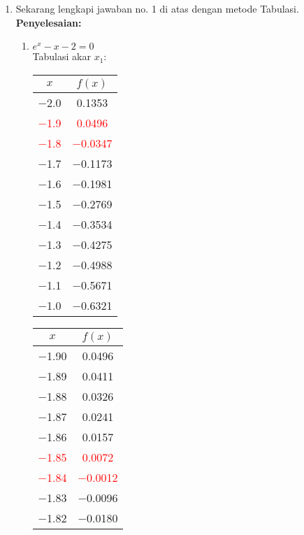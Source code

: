 \documentclass{article}
\newcommand{\penyelesaian}{\textbf{Penyelesaian: }}
\begin{document}
\begin{enumerate}
    \item Sekarang lengkapi jawaban no. 1 di atas dengan metode Tabulasi. \\
    \penyelesaian 
    \begin{enumerate}
        \item $e^x - x - 2 = 0$ \\
        Tabulasi akar $x_1$: \\
        \begin{tabular}{|c|c|}
            \hline
            $x$   & $f(x)$ \\
            \hline
            \num{-2,0} & \num{0,1353} \\
            \textcolor{red}{\num{-1,9}} & \textcolor{red}{\num{0,0496}} \\
            \textcolor{red}{\num{-1,8}} & \textcolor{red}{\num{-0,0347}} \\
            \num{-1,7} & \num{-0,1173} \\
            \num{-1,6} & \num{-0,1981} \\
            \num{-1,5} & \num{-0,2769} \\
            \num{-1,4} & \num{-0,3534} \\
            \num{-1,3} & \num{-0,4275} \\
            \num{-1,2} & \num{-0,4988} \\
            \num{-1,1} & \num{-0,5671} \\
            \num{-1,0} & \num{-0,6321} \\
            \hline
            \end{tabular}\quad
            \begin{tabular}{|c|c|}
            \hline
            $x$   & $f(x)$ \\
            \hline
            \num{-1,90} & \num{0,0496} \\
            \num{-1,89} & \num{0,0411} \\
            \num{-1,88} & \num{0,0326} \\
            \num{-1,87} & \num{0,0241} \\
            \num{-1,86} & \num{0,0157} \\
            \textcolor{red}{\num{-1,85}} & \textcolor{red}{\num{0,0072}} \\
            \textcolor{red}{\num{-1,84}} & \textcolor{red}{\num{-0,0012}} \\
            \num{-1,83} & \num{-0,0096} \\
            \num{-1,82} & \num{-0,0180} \\

\end{tabular}
\end{enumerate}
\end{enumerate}
\end{document}
